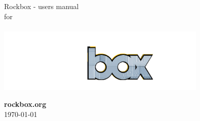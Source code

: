 \thispagestyle{empty}
\vspace*{0.3cm}
\begin{center}
\Huge{Rockbox - users manual\\for\\\playername}\vspace{1cm}\\
\includegraphics[width=10cm]{frontpage/rockbox3540.png}
\vspace{\fill}

\large \textbf{rockbox.org}\ \\\today


\end{center}

\pagebreak
\thispagestyle{empty}
\cleardoublepage
